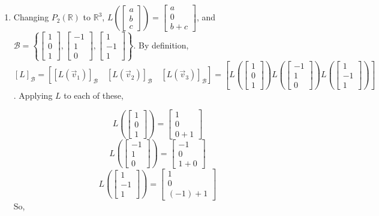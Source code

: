 \documentclass[10pt,english]{article}
\begin{document}
\begin{enumerate}
\pagebreak
\item Changing $P_2(\mathbb{R})$ to $\mathbb{R}^3$, $L\left(\begin{bmatrix}a\\b\\c\end{bmatrix}\right)=\begin{bmatrix}a\\0\\b+c\end{bmatrix}$, and $\mathcal{B}=\left\{\begin{bmatrix}1\\0\\1\end{bmatrix},\begin{bmatrix}-1\\1\\0\end{bmatrix},\begin{bmatrix}1\\-1\\1\end{bmatrix}\right\}$. By definition, $[L]_\mathcal{B}=\left[[L(\vec{v}_1)]_\mathcal{B}\quad[L(\vec{v}_2)]_\mathcal{B}\quad[L(\vec{v}_3)]_\mathcal{B}\right]=\left[L\left(\begin{bmatrix}1\\0\\1\end{bmatrix}\right)L\left(\begin{bmatrix}-1\\1\\0\end{bmatrix}\right)L\left(\begin{bmatrix}1\\-1\\1\end{bmatrix}\right)\right]$. Applying $L$ to each of these, 

$$L\left(\begin{bmatrix}1\\0\\1\end{bmatrix}\right)=\begin{bmatrix}1\\0\\0+1\end{bmatrix}$$ $$L\left(\begin{bmatrix}-1\\1\\0\end{bmatrix}\right)=\begin{bmatrix}-1\\0\\1+0\end{bmatrix}$$ $$L\left(\begin{bmatrix}1\\-1\\1\end{bmatrix}\right)=\begin{bmatrix}1\\0\\(-1)+1\end{bmatrix}$$ So, 


\end{enumerate}
\end{document}
